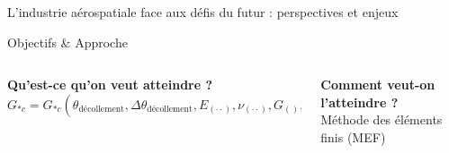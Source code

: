 \documentclass[final]{beamer}
\begin{document}
\begin{frame}
\begin{center}
\begin{minipage}{\textwidth}
\begin{block}{\rule[-0.6ex]{0pt}{50pt}\centering\LARGE L'industrie a\'erospatiale face aux d\'efis du futur : perspectives et enjeux}
\end{block}
\end{minipage}
\end{center}

\begin{center}
	\begin{minipage}{\textwidth}
		\begin{alertblock}{\rule[-0.6ex]{0pt}{50pt}\centering\LARGE Objectifs \& Approche}
			\begin{columns}
				\begin{column}{0.6\textwidth}
   					 \begin{center}
						\vspace{40pt}
						\textbf{\LARGE Qu'est-ce qu'on veut atteindre ?}\\[25pt]
						 \LARGE $G_{*c}=G_{*c}\left(\theta_{\text{d\'ecollement}},\Delta\theta_{\text{d\'ecollement}}, E_{\left(\cdot\cdot\right)}, \nu_{\left(\cdot\cdot\right)}, G_{\left(\right)},VF_{f}, t_{\text{pli}}, \frac{t_{\text{pli}}}{t_{\text{couches adjacentes}}}\right)$\\[20pt]
   					\end{center}
				\end{column}
				\begin{column}{0.4\textwidth}  %
   					\begin{center}
						\vspace{40pt}
						\textbf{\LARGE Comment veut-on l'atteindre ?}\\[25pt]
						 \LARGE M\'ethode des \'el\'ements finis (MEF)
   					\end{center}
				\end{column}
			\end{columns}
		\end{alertblock}
	\end{minipage}
\end{center}




\end{frame}
\end{document}
